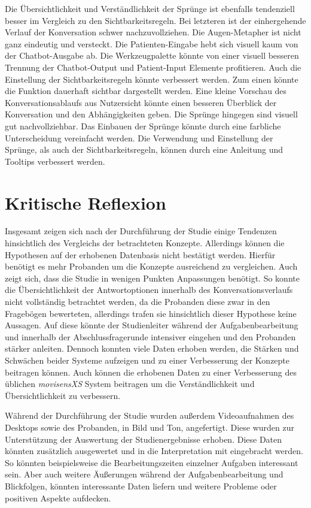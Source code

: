 Die Übersichtlichkeit und Verständlichkeit der Sprünge ist ebenfalls tendenziell besser im Vergleich zu den Sichtbarkeitsregeln. Bei letzteren ist der einhergehende Verlauf der Konversation schwer nachzuvollziehen. Die Augen-Metapher ist nicht ganz eindeutig und versteckt. Die Patienten-Eingabe hebt sich visuell kaum von der Chatbot-Ausgabe ab. Die Werkzeugpalette könnte von einer visuell besseren Trennung der Chatbot-Output und Patient-Input Elemente profitieren. Auch die Einstellung der Sichtbarkeitsregeln könnte verbessert werden. Zum einen könnte die Funktion dauerhaft sichtbar dargestellt werden. Eine kleine Vorschau des Konversationsablaufs aus Nutzersicht könnte einen besseren Überblick der Konversation und den Abhängigkeiten geben. Die Sprünge hingegen sind visuell gut nachvollziehbar. Das Einbauen der Sprünge könnte durch eine farbliche Unterscheidung vereinfacht werden. Die Verwendung und Einstellung der Sprünge, als auch der Sichtbarkeitsregeln, können durch eine Anleitung und Tooltips verbessert werden.


\section{Kritische Reflexion}
Insgesamt zeigen sich nach der Durchführung der Studie einige Tendenzen hinsichtlich des Vergleichs der betrachteten Konzepte. Allerdings können die Hypothesen auf der erhobenen Datenbasis nicht bestätigt werden. Hierfür benötigt es mehr Probanden um die Konzepte ausreichend zu vergleichen. Auch zeigt sich, dass die Studie in wenigen Punkten Anpassungen benötigt. So konnte die Übersichtlichkeit der Antwortoptionen innerhalb des Konversationsverlaufs nicht vollständig betrachtet werden, da die Probanden diese zwar in den Fragebögen bewerteten, allerdings trafen sie hinsichtlich dieser Hypothese keine Aussagen. Auf diese könnte der Studienleiter während der Aufgabenbearbeitung und innerhalb der Abschlussfragerunde intensiver eingehen und den Probanden stärker anleiten. Dennoch konnten viele Daten erhoben werden, die Stärken und Schwächen beider Systeme aufzeigen und zu einer Verbesserung der Konzepte beitragen können. Auch können die erhobenen Daten zu einer Verbesserung des üblichen \emph{movisensXS} System beitragen um die Verständlichkeit und Übersichtlichkeit zu verbessern. 

Während der Durchführung der Studie wurden außerdem Videoaufnahmen des Desktops sowie des Probanden, in Bild und Ton, angefertigt. Diese wurden zur Unterstützung der Auswertung der Studienergebnisse erhoben. Diese Daten könnten zusätzlich ausgewertet und in die Interpretation mit eingebracht werden. So könnten beispielsweise die Bearbeitungszeiten einzelner Aufgaben interessant sein. Aber auch weitere Äußerungen während der Aufgabenbearbeitung und Blickfolgen, könnten interessante Daten liefern und weitere Probleme oder positiven Aspekte aufdecken.



